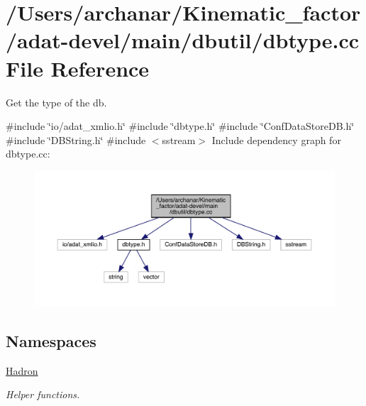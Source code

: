 \hypertarget{adat-devel_2main_2dbutil_2dbtype_8cc}{}\section{/\+Users/archanar/\+Kinematic\+\_\+factor/adat-\/devel/main/dbutil/dbtype.cc File Reference}
\label{adat-devel_2main_2dbutil_2dbtype_8cc}


Get the type of the db.  


{\ttfamily \#include \char`\"{}io/adat\+\_\+xmlio.\+h\char`\"{}}\newline
{\ttfamily \#include \char`\"{}dbtype.\+h\char`\"{}}\newline
{\ttfamily \#include \char`\"{}Conf\+Data\+Store\+D\+B.\+h\char`\"{}}\newline
{\ttfamily \#include \char`\"{}D\+B\+String.\+h\char`\"{}}\newline
{\ttfamily \#include $<$sstream$>$}\newline
Include dependency graph for dbtype.\+cc\+:
\nopagebreak
\begin{figure}[H]
\begin{center}
\leavevmode
\includegraphics[width=350pt]{d2/df5/adat-devel_2main_2dbutil_2dbtype_8cc__incl}
\end{center}
\end{figure}
\subsection*{Namespaces}
\begin{DoxyCompactItemize}
\item 
 \mbox{\hyperlink{namespaceHadron}{Hadron}}
\begin{DoxyCompactList}\small\item\em Helper functions. \end{DoxyCompactList}\end{DoxyCompactItemize}
